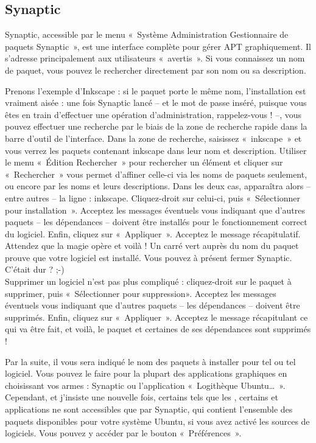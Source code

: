{\subsection{Synaptic}
\label{RefInstallSynaptic}
Synaptic, accessible par le menu «~Système \FlecheDroite Administration \FlecheDroite Gestionnaire de paquets Synaptic~», est une interface complète pour gérer APT graphiquement. Il s'adresse principalement aux utilisateurs «~avertis~». Si vous connaissez un nom de paquet, vous pouvez le rechercher directement par son nom ou sa description.\par
{}
Prenons l'exemple d'Inkscape : si le paquet porte le même nom, l'installation est vraiment aisée : une fois Synaptic lancé -- et le mot de passe inséré, puisque vous êtes en train d'effectuer une opération d'administration, rappelez-vous ! --, vous pouvez effectuer une recherche par le biais de la zone de recherche rapide dans la barre d'outil de l'interface. Dans la zone de recherche, saisissez «~inkscape~» et vous verrez les paquets contenant inkscape dans leur nom et description. Utiliser le menu «~Édition \FlecheDroite Rechercher~» pour rechercher un élément et cliquer sur «~Rechercher~» vous permet d'affiner celle-ci via les noms de paquets seulement, ou encore par les noms et leurs descriptions. Dans les deux cas, apparaîtra alors -- entre autres -- la ligne : inkscape. Cliquez-droit sur celui-ci, puis «~Sélectionner pour installation~». Acceptez les messages éventuels vous indiquant que d'autres paquets -- les dépendances -- doivent être installés pour le fonctionnement correct du logiciel. Enfin, cliquez sur «~Appliquer~». Acceptez le message récapitulatif. Attendez que la magie opère et voilà ! Un carré vert auprès du nom du paquet prouve que votre logiciel est installé. Vous pouvez à présent fermer Synaptic. C'était dur ? ;-)\\
Supprimer un logiciel n'est pas plus compliqué : cliquez-droit sur le paquet à supprimer, puis «~Sélectionner pour suppression». Acceptez les messages éventuels vous indiquant que d'autres paquets -- les dépendances -- doivent être supprimés. Enfin, cliquez sur «~Appliquer~». Acceptez le message récapitulant ce qui va être fait, et voilà, le paquet et certaines de ses dépendances sont supprimés !
\begin{nota}
Par la suite, il vous sera indiqué le nom des paquets à installer pour tel ou tel logiciel. Vous pouvez le faire pour la plupart des applications graphiques en choisissant vos armes : Synaptic ou l'application «~Logithèque Ubuntu\dots{}~». Cependant, et j'insiste une nouvelle fois, certains  tels que les  , certains  et applications ne sont accessibles que par Synaptic, qui contient l'ensemble des paquets disponibles pour votre système Ubuntu, si vous avez activé les sources de logiciels. Vous pouvez y accéder par le bouton «~Préférences~».\\

\end{nota}}
